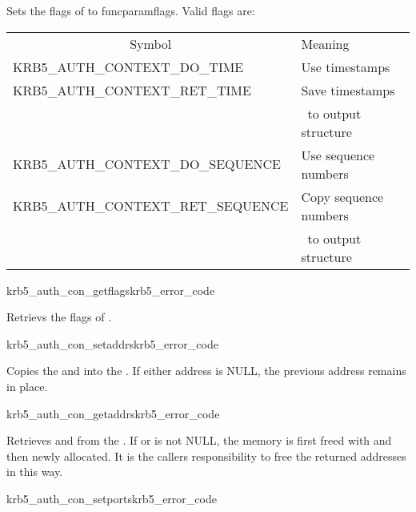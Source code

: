 Sets the flags of  to funcparam{flags}. Valid
flags are:

\begin{tabular}{ll}
\multicolumn{1}{c}{Symbol} & Meaning \\
KRB5_AUTH_CONTEXT_DO_TIME & Use timestamps \\
KRB5_AUTH_CONTEXT_RET_TIME & Save timestamps\\ &\  to output structure\\
KRB5_AUTH_CONTEXT_DO_SEQUENCE	& Use sequence numbers \\
KRB5_AUTH_CONTEXT_RET_SEQUENCE	& Copy sequence numbers \\ &\ to output structure\\
\end{tabular}


\begin{funcdecl}{krb5_auth_con_getflags}{krb5_error_code}{\funcinout}
\funcin
{}
\funcout
{}
\end{funcdecl}

Retrievs the flags of .

\begin{funcdecl}{krb5_auth_con_setaddrs}{krb5_error_code}{\funcinout}
\funcin
{}
\end{funcdecl}

Copies the  and  into the
. If either address is NULL, the previous
address remains in place.

\begin{funcdecl}{krb5_auth_con_getaddrs}{krb5_error_code}{\funcinout}
\funcout
{}
\end{funcdecl}

Retrieves   and  from the
. If  or
 is not NULL, the memory is first freed with
 and then newly allocated. It is the callers
responsibility to free the returned addresses in this way.


\begin{funcdecl}{krb5_auth_con_setports}{krb5_error_code}{\funcinout}
\funcin
{}
\end{funcdecl}


